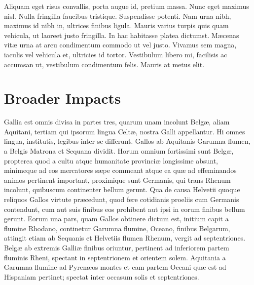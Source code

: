 \documentclass[12pt]{amsart}
\theoremstyle{definition}
\numberwithin{equation}{section}
\begin{document}
Aliquam eget risus convallis, porta augue id, pretium massa. Nunc eget maximus nisl. Nulla fringilla faucibus tristique. Suspendisse potenti. Nam urna nibh, maximus id nibh in, ultrices finibus ligula. Mauris varius turpis quis quam vehicula, ut laoreet justo fringilla. In hac habitasse platea dictumst. M{\ae}cenas vit{\ae} urna at arcu condimentum commodo ut vel justo. Vivamus sem magna, iaculis vel vehicula et, ultricies id tortor. Vestibulum libero mi, facilisis ac accumsan ut, vestibulum condimentum felis. Mauris at metus elit.

\section{Broader Impacts}

Gallia est omnis divisa in partes tres, quarum unam incolunt Belg{\ae}, aliam Aquitani, tertiam qui ipsorum lingua Celt{\ae}, nostra Galli appellantur.  Hi omnes lingua, institutis, legibus inter se differunt. Gallos ab Aquitanis Garumna flumen, a Belgis Matrona et Sequana dividit.  Horum omnium fortissimi sunt Belg{\ae}, propterea quod a cultu atque humanitate provinci{\ae} longissime absunt, minimeque ad eos mercatores s{\ae}pe commeant atque ea qu{\ae} ad effeminandos animos pertinent important, proximique sunt Germanis, qui trans Rhenum incolunt, quibuscum continenter bellum gerunt. Qua de causa Helvetii quoque reliquos Gallos virtute pr{\ae}cedunt, quod fere cotidianis proeliis cum Germanis contendunt, cum aut suis finibus eos prohibent aut ipsi in eorum finibus bellum gerunt. Eorum una pars, quam Gallos obtinere dictum est, initium capit a flumine Rhodano, continetur Garumna flumine, Oceano, finibus Belgarum, attingit etiam ab Sequanis et Helvetiis flumen Rhenum, vergit ad septentriones.  Belg{\ae} ab extremis Galli{\ae} finibus oriuntur, pertinent ad inferiorem partem fluminis Rheni, spectant in septentrionem et orientem solem.  Aquitania a Garumna flumine ad Pyren{\ae}os montes et eam partem Oceani qu{\ae} est ad Hispaniam pertinet; spectat inter occasum solis et septentriones.

%
%
\end{document}
